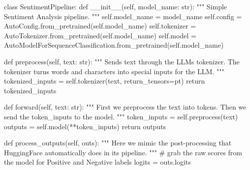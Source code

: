\documentclass[
  letterpaper,
  DIV=11,
  numbers=noendperiod]{scrartcl}
\newenvironment{Shaded}{\begin{snugshade}}{\end{snugshade}}
\newcommand{\BuiltInTok}[1]{\textcolor[rgb]{0.00,0.23,0.31}{#1}}
\newcommand{\CommentTok}[1]{\textcolor[rgb]{0.37,0.37,0.37}{#1}}
\newcommand{\ControlFlowTok}[1]{\textcolor[rgb]{0.00,0.23,0.31}{#1}}
\newcommand{\FunctionTok}[1]{\textcolor[rgb]{0.28,0.35,0.67}{#1}}
\newcommand{\KeywordTok}[1]{\textcolor[rgb]{0.00,0.23,0.31}{#1}}
\newcommand{\NormalTok}[1]{\textcolor[rgb]{0.00,0.23,0.31}{#1}}
\newcommand{\OperatorTok}[1]{\textcolor[rgb]{0.37,0.37,0.37}{#1}}
\newcommand{\StringTok}[1]{\textcolor[rgb]{0.13,0.47,0.30}{#1}}
\newcommand{\VariableTok}[1]{\textcolor[rgb]{0.07,0.07,0.07}{#1}}
\begin{document}
\begin{Shaded}
\begin{Highlighting}[]
\KeywordTok{class}\NormalTok{ SentimentPipeline:}
    \KeywordTok{def} \FunctionTok{\_\_init\_\_}\NormalTok{(}\VariableTok{self}\NormalTok{, model\_name: }\BuiltInTok{str}\NormalTok{):}
        \CommentTok{"""}
\CommentTok{        Simple Sentiment Analysis pipeline.}
\CommentTok{        """}
        \VariableTok{self}\NormalTok{.model\_name }\OperatorTok{=}\NormalTok{ model\_name}
        \VariableTok{self}\NormalTok{.config }\OperatorTok{=}\NormalTok{ AutoConfig.from\_pretrained(}\VariableTok{self}\NormalTok{.model\_name)}
        \VariableTok{self}\NormalTok{.tokenizer }\OperatorTok{=}\NormalTok{ AutoTokenizer.from\_pretrained(}\VariableTok{self}\NormalTok{.model\_name)}
        \VariableTok{self}\NormalTok{.model }\OperatorTok{=}\NormalTok{ AutoModelForSequenceClassification.from\_pretrained(}\VariableTok{self}\NormalTok{.model\_name)}

    \KeywordTok{def}\NormalTok{ preprocess(}\VariableTok{self}\NormalTok{, text: }\BuiltInTok{str}\NormalTok{):}
        \CommentTok{"""}
\CommentTok{        Sends \textasciigrave{}text\textasciigrave{} through the LLM\textquotesingle{}s tokenizer.  }
\CommentTok{        The tokenizer turns words and characters into special inputs for the LLM.}
\CommentTok{        """}
\NormalTok{        tokenized\_inputs }\OperatorTok{=} \VariableTok{self}\NormalTok{.tokenizer(text, return\_tensors}\OperatorTok{=}\StringTok{\textquotesingle{}pt\textquotesingle{}}\NormalTok{)}
        \ControlFlowTok{return}\NormalTok{ tokenized\_inputs}

    \KeywordTok{def}\NormalTok{ forward(}\VariableTok{self}\NormalTok{, text: }\BuiltInTok{str}\NormalTok{):}
        \CommentTok{"""}
\CommentTok{        First we preprocess the \textasciigrave{}text\textasciigrave{} into tokens.}
\CommentTok{        Then we send the \textasciigrave{}token\_inputs\textasciigrave{} to the model.}
\CommentTok{        """}
\NormalTok{        token\_inputs }\OperatorTok{=} \VariableTok{self}\NormalTok{.preprocess(text)}
\NormalTok{        outputs }\OperatorTok{=} \VariableTok{self}\NormalTok{.model(}\OperatorTok{**}\NormalTok{token\_inputs)}
        \ControlFlowTok{return}\NormalTok{ outputs}

    \KeywordTok{def}\NormalTok{ process\_outputs(}\VariableTok{self}\NormalTok{, outs):}
        \CommentTok{"""}
\CommentTok{        Here we mimic the post{-}processing that HuggingFace automatically does in its \textasciigrave{}pipeline\textasciigrave{}.  }
\CommentTok{        """}
        \CommentTok{\# grab the raw scores from the model for Positive and Negative labels}
\NormalTok{        logits }\OperatorTok{=}\NormalTok{ outs.logits}


\end{Highlighting}
\end{Shaded}
\end{document}
